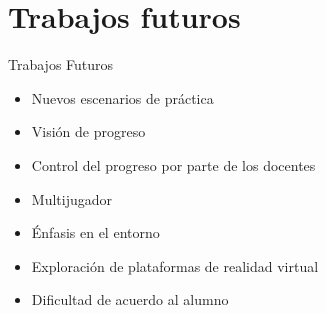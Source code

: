 \section{Trabajos futuros}

\begin{frame}{Trabajos Futuros}
    \begin{itemize}[<+->]
        \item Nuevos escenarios de práctica
        \item Visión de progreso
        \item Control del progreso por parte de los docentes
        \item Multijugador
        \item Énfasis en el entorno
        \item Exploración de plataformas de realidad virtual
        \item Dificultad de acuerdo al alumno
    \end{itemize}
\end{frame}

